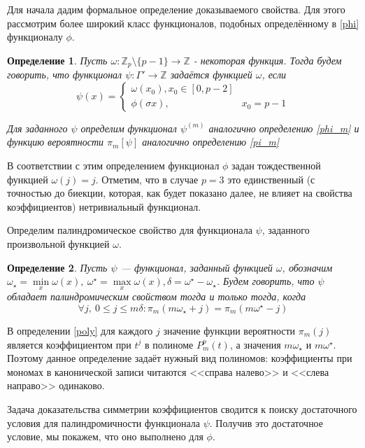 \documentclass[14pt, a4paper, russian]{report}
\newtheorem{definition}{\indent Определение}
\begin{document}
Для начала дадим формальное определение доказываемого свойства. Для этого рассмотрим более широкий класс функционалов, подобных определённому в \cref{phi} функционалу $\phi$.
\begin{definition}
Пусть $\omega: \mathbb{Z}_p \setminus \{p-1\} \to \mathbb{Z}$ - некоторая функция. Тогда будем говорить, что функционал $\psi: \Gamma' \to \mathbb{Z}$ задаётся функцией $\omega$, если
$$
    \psi(x) = \begin{cases}
                    \omega(x_0),x_0 \in \left[0,  p - 2\right] \\
                    \phi(\sigma x), & x_0 = p - 1
                \end{cases}
$$

Для заданного $\psi$ определим функционал $\psi^{(m)}$ аналогично определению \cref{phi_m} и функцию вероятности $\pi_m[\psi]$ аналогично определению \cref{pi_m}
\end{definition}

В соответствии с этим определением функционал $\phi$ задан тождественной функцией $\omega(j)=j$. Отметим, что в случае $p=3$ это единственный (с точностью до биекции, которая, как будет показано далее, не влияет на свойства коэффициентов) нетривиальный функционал. 

Определим палиндромическое свойство для функционала $\psi$, заданного произвольной функцией $\omega$.

\begin{definition}
Пусть $\psi$ --- функционал, заданный функцией $\omega$, обозначим $\omega_\star = \min\limits_x \omega(x),\ \omega^\star = \max\limits_x \omega(x), \delta=\omega^\star - \omega_\star$. Будем говорить, что  $\psi$  \emph{обладает палиндромическим свойством} тогда и только тогда, когда
$$
\forall j,\ 0 \le j \le m\delta:   \pi_m(m\omega_\star + j)=\pi_m(m\omega^\star-j)
$$
\end{definition}

В определении \cref{poly} для каждого $j$ значение функции вероятности $\pi_m(j)$ является коэффициентом при $t^j$ в полиноме $P_m^p(t)$, а значения $m\omega_\star$ и $m\omega^\star$. Поэтому данное определение задаёт нужный вид полиномов: коэффициенты при мономах в канонической записи читаются <<справа налево>> и <<слева направо>> одинаково.

Задача доказательства симметрии коэффициентов сводится к поиску достаточного условия для палиндромичности функционала $\psi$. Получив это достаточное условие, мы покажем, что оно выполнено для $\phi$.
\end{document}
